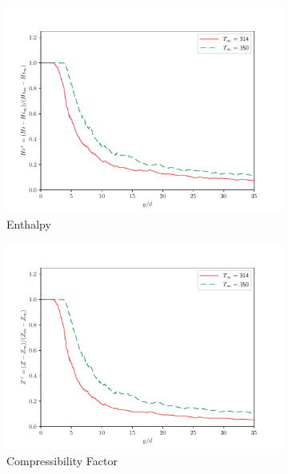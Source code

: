 \begin{figure}[H]
\begin{center}
\begin{subfigure}{0.45\textwidth}
	\includegraphics[scale=.35]{figures/Plots/centerline/Hi_centerline_scaled.pdf}
	\caption{Enthalpy} \label{noniso_Hi_centerline_1}
\end{subfigure}
\begin{subfigure}{0.45\textwidth}
\centering
	\includegraphics[scale=.35]{figures/Plots/centerline/Z_centerline_scaled.pdf}
	\caption{Compressibility Factor} \label{noniso_Z_centerline_1}
\end{subfigure}
\vfill
\begin{subfigure}{0.45\textwidth}
\centering

\end{subfigure}
\end{center}
\end{figure}

